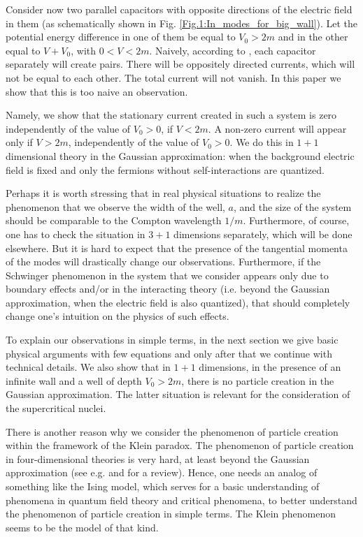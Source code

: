 \documentclass[12pt]{article}
\begin{document}
Consider now two parallel capacitors with opposite directions of the electric field in them (as schematically shown in Fig. \ref{Fig.1:In_modes_for_big_wall}). Let the potential energy difference in one of them be equal to $V_0 > 2m$ and in the other equal to $V+V_0$, with $0<V<2m$. Naively, according to \cite{Schwinger:1951nm}, each capacitor separately will create pairs. There will be oppositely directed currents, which will not be equal to each other. The total current will not vanish. In this paper we show that this is too naive an observation.

Namely, we show that the stationary current created in such a system is zero independently of the value of $V_0>0$, if $V<2m$. A non-zero current will appear only if $V>2m$, independently of the value of $V_0>0$. We do this in $1+1$ dimensional theory in the Gaussian approximation: when the background electric field is fixed and only the fermions without self-interactions are quantized.

Perhaps it is worth stressing that in real physical situations to realize the phenomenon that we observe the width of the well, $a$, and the size of the system should be comparable to the Compton wavelength $1/m$. Furthermore, of course, one has to check the situation in $3+1$ dimensions separately, which will be done elsewhere. But it is hard to expect that the presence of the tangential momenta of the modes will drastically change our observations. Furthermore, if the Schwinger phenomenon in the system that we consider appears only due to boundary effects and/or in the interacting theory (i.e. beyond the Gaussian approximation, when the electric field is also quantized), that should completely change one's intuition on the physics of such effects.

To explain our observations in simple terms, in the next section we give basic physical arguments with few equations and only after that we continue with technical details. We also show that in $1+1$ dimensions, in the presence of an infinite wall and a well of depth $V_0 > 2m$, there is no particle creation in the Gaussian approximation. The latter situation is relevant for the consideration of the supercritical nuclei.

There is another reason why we consider the phenomenon of particle creation within the framework of the Klein paradox. The phenomenon of particle creation in four-dimensional theories 
is very hard, at least  beyond the Gaussian approximation (see e.g. \cite{Akhmedov:2026wew,Akhmedov:2024npw,Akhmedov:2024rkt,Akhmedov:2024lce,Akhmedov:2023zfy} and \cite{Akhmedov:2021rhq} for a review). Hence, one needs an analog of something like the Ising model, which serves for a basic understanding of phenomena in quantum field theory and critical phenomena, to better understand the phenomenon of particle creation in simple terms. The Klein phenomenon seems to be the model of that kind.
    
\end{document}
